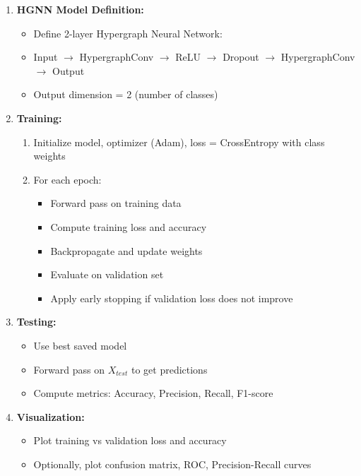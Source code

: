 \documentclass[conference]{IEEEtran}
\begin{document}
\begin{enumerate}
    \item \textbf{HGNN Model Definition:}
    \begin{itemize}
        \item Define 2-layer Hypergraph Neural Network:
        \item Input $\rightarrow$ HypergraphConv $\rightarrow$ ReLU $\rightarrow$ Dropout $\rightarrow$ HypergraphConv $\rightarrow$ Output
        \item Output dimension = 2 (number of classes)
    \end{itemize}
    
    \item \textbf{Training:}
    \begin{enumerate}
        \item Initialize model, optimizer (Adam), loss = CrossEntropy with class weights
        \item For each epoch:
        \begin{itemize}
            \item Forward pass on training data
            \item Compute training loss and accuracy
            \item Backpropagate and update weights
            \item Evaluate on validation set
            \item Apply early stopping if validation loss does not improve
        \end{itemize}
    \end{enumerate}
    
    \item \textbf{Testing:}
    \begin{itemize}
        \item Use best saved model
        \item Forward pass on $X_{test}$ to get predictions
        \item Compute metrics: Accuracy, Precision, Recall, F1-score
    \end{itemize}
    
    \item \textbf{Visualization:}
    \begin{itemize}
        \item Plot training vs validation loss and accuracy
        \item Optionally, plot confusion matrix, ROC, Precision-Recall curves
    \end{itemize}
\end{enumerate}
\end{document}
